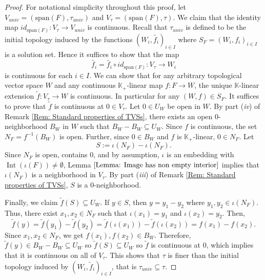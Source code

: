 \documentclass[a4paper,11pt]{article}
\numberwithin{equation}{section}
\theoremstyle{definition}
\theoremstyle{plain}
\newcommand{\spn}{\mathrm{span}}
\DeclareMathOperator{\Int}{Int}
\begin{document}
\begin{proof}
    For notational simplicity throughout this proof, let $V_{univ} = (\spn(F), \tau_{univ})$ and $V_{\tau} = (\spn(F), \tau)$. We claim that the identity map $id_{\spn(F)}: V_{\tau} \longrightarrow V_{univ}$ is continuous. Recall that $\tau_{univ}$ is defined to be the initial topology induced by the functions $(W_{i}, \tilde{f_{i}})_{i \in I}$ where $S_{F} = (W_{i}, f_{i})_{i \in I}$ is a solution set. Hence it suffices to show that the map
    $$\tilde{f_{i}} = \tilde{f_{i}} \circ id_{\spn(F)}: V_{\tau} \longrightarrow W_{i}$$
    is continuous for each $i \in I$. We can show that for any arbitrary topological vector space $W$ and any continuous $\mathbb{K}_{+}$-linear map $f: F \longrightarrow W$, the unique $\mathbb{K}$-linear extension $\tilde{f}: V_{\tau} \longrightarrow W$ is continuous. In particular for any $(W, f) \in S_{F}$. It suffices to prove that $\tilde{f}$ is continuous at $0 \in V_{\tau}$. Let $0 \in U_{W}$ be open in $W$. By part (\textit{iv}) of Remark \ref{Rem: Standard properties of TVSs}, there exists an open $0$-neighborhood $B_{W}$ in $W$ such that $B_{W} - B_{W} \subseteq U_{W}$. Since $f$ is continuous, the set $N_{F} = f^{-1}(B_{W})$ is open. Further, since $0 \in B_{W}$ and $f$ is $\mathbb{K}_{+}$-linear, $0 \in N_{F}$. Let
    \begin{equation*}
        S := \iota(N_{F}) - \iota(N_{F}).
    \end{equation*}
    Since $N_{F}$ is open, contains $0$, and by assumption, $\iota$ is an embedding with $\Int(\iota(F)) \neq \emptyset$, Lemma $\ref{Lemma: Image has non empty interior}$ implies that $\iota(N_{F})$ is a neighborhood in $V_{\tau}$. By part (\textit{iii}) of Remark \ref{Rem: Standard properties of TVSs}, $S$ is a $0$-neighborhood.
    
    Finally, we claim $\tilde{f}(S) \subseteq U_{W}$. If $y \in S$, then $y = y_{1} - y_{2}$ where $y_{1}, y_{2} \in \iota(N_{F})$. Thus, there exist $x_{1}, x_{2} \in N_{F}$ such that $\iota(x_{1}) = y_{1}$ and $\iota(x_{2}) = y_{2}$. Then,
    $$\tilde{f}(y) = \tilde{f}(y_{1}) - \tilde{f}(y_{2}) = \tilde{f}(\iota(x_{1})) - \tilde{f}(\iota(x_{2})) = f(x_{1}) - f(x_{2}).$$
    Since $x_{1}, x_{2} \in N_{F}$, we get $f(x_{1}), f(x_{2}) \in B_{W}$. Therefore, $\tilde{f}(y) \in B_{W} - B_{W} \subseteq U_{W}$
    so $\tilde{f}(S) \subseteq U_{W}$ so $\tilde{f}$ is continuous at $0$, which implies that it is continuous on all of $V_{\tau}$. This shows that $\tau$ is finer than the initial topology induced by $(W_{i}, \tilde{f}_{i})_{i \in I}$, that is $\tau_{univ} \subseteq \tau$.
\end{proof}
\end{document}
